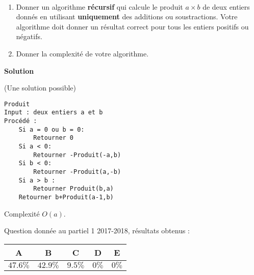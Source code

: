 
\begin{exercice}[Partiel 2017-2018]~

\begin{enumerate}
\item Donner un algorithme \textbf{récursif} qui calcule le produit $a \times b$ de deux entiers donnés en utilisant \textbf{uniquement} des additions ou soustractions. Votre algorithme doit donner un résultat correct pour tous les entiers positifs ou négatifs.

\item Donner la complexité de votre algorithme.
\end{enumerate}

\textbf{Solution}

(Une solution possible)

\begin{lstlisting}
Produit
Input : deux entiers a et b
Procédé :
    Si a = 0 ou b = 0:
        Retourner 0
    Si a < 0:
        Retourner -Produit(-a,b)
    Si b < 0:
        Retourner -Produit(a,-b)
    Si a > b :
        Retourner Produit(b,a)
    Retourner b+Produit(a-1,b)
\end{lstlisting}

Complexité $O(a)$.

Question donnée au partiel 1 2017-2018, résultats obtenus :

\begin{tabular}{|c|c|c|c|c|}
\hline
A & B & C & D & E \\ \hline
$47.6\%$ & $42.9\%$ & $9.5\%$ & $0\%$ & $0\%$ \\ \hline
\end{tabular} 


\end{exercice}